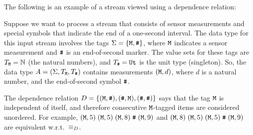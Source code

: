 
The following is an example of a stream viewed using a dependence relation:

\begin{example}
\label{45:ex:dependence}
Suppose we want to process a stream that consists of sensor measurements and special symbols that indicate the end of a one-second interval. The data type for this input stream involves the tags $\Sigma = \{ \texttt{M}, \texttt{\#} \}$, where $\texttt{M}$ indicates a sensor measurement and $\texttt{\#}$ is an end-of-second marker. The value sets for these tags are $T_{\texttt{M}} = \mathbb{N}$ (the natural numbers), and $T_{\texttt{\#}} = \mathtt{Ut}$ is the unit type (singleton). So, the data type $A = (\Sigma,T_{\texttt{M}},T_{\texttt{\#}})$ contains measurements $(\texttt{M}, d)$, where $d$ is a natural number, and the end-of-second symbol $\texttt{\#}$.

The dependence relation $D = \{ (\texttt{M}, \texttt{\#}), (\texttt{\#}, \texttt{M}), (\texttt{\#},\texttt{\#}) \}$ says that the tag $\texttt{M}$ is independent of itself, and therefore consecutive $\texttt{M}$-tagged items are considered unordered. For example, $(\texttt{M}, 5) \; (\texttt{M}, 5) \; (\texttt{M}, 8) \; \texttt{\#} \; (\texttt{M}, 9)$ and $(\texttt{M}, 8) \; (\texttt{M}, 5) \; (\texttt{M}, 5) \; \texttt{\#} \; (\texttt{M}, 9)$ are equivalent w.r.t.\ $\equiv_D$.
\end{example}

